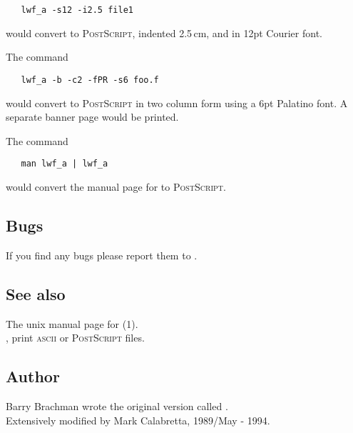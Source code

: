 \begin{verbatim}
   lwf_a -s12 -i2.5 file1
\end{verbatim}

\noindent
would convert  to \textsc{PostScript}, indented 2.5\,cm, and in
12pt Courier font.

The command

\begin{verbatim}
   lwf_a -b -c2 -fPR -s6 foo.f
\end{verbatim}

\noindent
would convert  to \textsc{PostScript} in two column form using a
6pt Palatino font.  A separate banner page would be printed.

The command

\begin{verbatim}
   man lwf_a | lwf_a
\end{verbatim}

\noindent
would convert the manual page for  to \textsc{PostScript}.

\subsection*{Bugs}

If you find any bugs please report them to .

\subsection*{See also}

The unix manual page for (1).\\
, print \textsc{ascii} or \textsc{PostScript} files.

\subsection*{Author}

Barry Brachman wrote the original version called .\\
Extensively modified by Mark Calabretta, 1989/May - 1994.


\newpage
\section{}
\label{pra}

